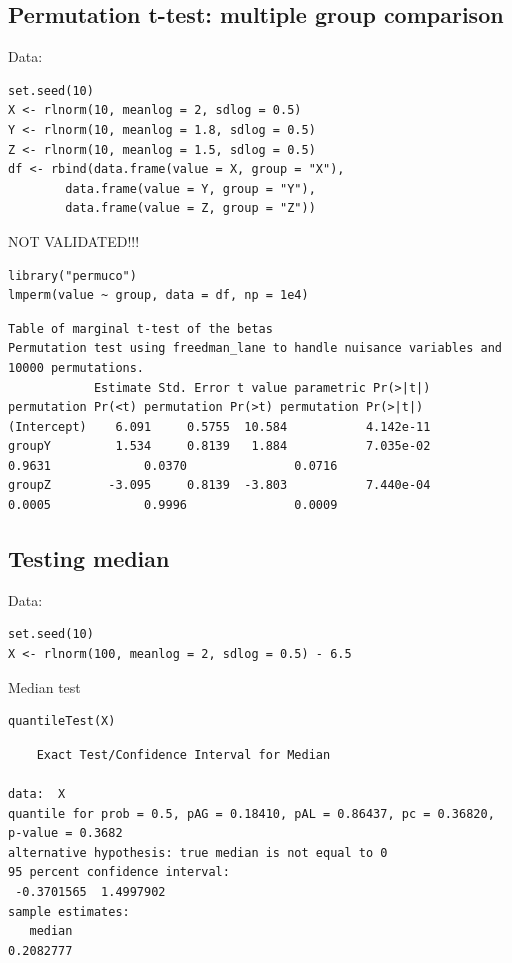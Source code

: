 \documentclass{article}
\begin{document}
\subsection{Permutation t-test: multiple group comparison}
\label{sec:orgb51be6b}
Data:
\lstset{language=r,label= ,caption= ,captionpos=b,numbers=none}
\begin{lstlisting}
set.seed(10)
X <- rlnorm(10, meanlog = 2, sdlog = 0.5)
Y <- rlnorm(10, meanlog = 1.8, sdlog = 0.5)
Z <- rlnorm(10, meanlog = 1.5, sdlog = 0.5)
df <- rbind(data.frame(value = X, group = "X"),
	    data.frame(value = Y, group = "Y"),
	    data.frame(value = Z, group = "Z"))
\end{lstlisting}

NOT VALIDATED!!! 
\lstset{language=r,label= ,caption= ,captionpos=b,numbers=none}
\begin{lstlisting}
library("permuco")
lmperm(value ~ group, data = df, np = 1e4)
\end{lstlisting}

\begin{verbatim}
Table of marginal t-test of the betas
Permutation test using freedman_lane to handle nuisance variables and 10000 permutations.
            Estimate Std. Error t value parametric Pr(>|t|) permutation Pr(<t) permutation Pr(>t) permutation Pr(>|t|)
(Intercept)    6.091     0.5755  10.584           4.142e-11                                                           
groupY         1.534     0.8139   1.884           7.035e-02             0.9631             0.0370               0.0716
groupZ        -3.095     0.8139  -3.803           7.440e-04             0.0005             0.9996               0.0009
\end{verbatim}

\subsection{Testing median}
\label{sec:orgd2a0062}

Data:
\lstset{language=r,label= ,caption= ,captionpos=b,numbers=none}
\begin{lstlisting}
set.seed(10)
X <- rlnorm(100, meanlog = 2, sdlog = 0.5) - 6.5
\end{lstlisting}

Median test
\lstset{language=r,label= ,caption= ,captionpos=b,numbers=none}
\begin{lstlisting}
quantileTest(X)
\end{lstlisting}

\begin{verbatim}
	Exact Test/Confidence Interval for Median

data:  X
quantile for prob = 0.5, pAG = 0.18410, pAL = 0.86437, pc = 0.36820, p-value = 0.3682
alternative hypothesis: true median is not equal to 0
95 percent confidence interval:
 -0.3701565  1.4997902
sample estimates:
   median 
0.2082777
\end{verbatim}
\end{document}

